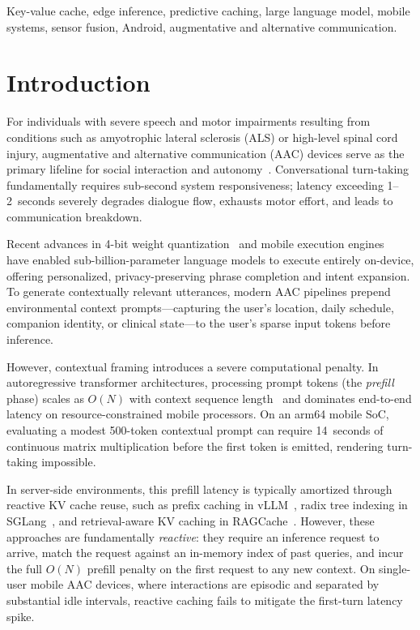 \documentclass[journal]{IEEEtran}
\begin{document}
\begin{IEEEkeywords}
Key-value cache, edge inference, predictive caching, large language model, mobile systems, sensor fusion, Android, augmentative and alternative communication.
\end{IEEEkeywords}

\section{Introduction}
\label{sec:introduction}

For individuals with severe speech and motor impairments resulting from conditions such as amyotrophic lateral sclerosis (ALS) or high-level spinal cord injury, augmentative and alternative communication (AAC) devices serve as the primary lifeline for social interaction and autonomy~\cite{beukelman2020}. Conversational turn-taking fundamentally requires sub-second system responsiveness; latency exceeding 1--2~seconds severely degrades dialogue flow, exhausts motor effort, and leads to communication breakdown.

Recent advances in 4-bit weight quantization~\cite{dettmers2022,frantar2022} and mobile execution engines~\cite{llamacpp} have enabled sub-billion-parameter language models to execute entirely on-device, offering personalized, privacy-preserving phrase completion and intent expansion. To generate contextually relevant utterances, modern AAC pipelines prepend environmental context prompts---capturing the user's location, daily schedule, companion identity, or clinical state---to the user's sparse input tokens before inference. 

However, contextual framing introduces a severe computational penalty. In autoregressive transformer architectures, processing prompt tokens (the \emph{prefill} phase) scales as $O(N)$ with context sequence length~\cite{vaswani2017} and dominates end-to-end latency on resource-constrained mobile processors. On an arm64 mobile SoC, evaluating a modest 500-token contextual prompt can require 14~seconds of continuous matrix multiplication before the first token is emitted, rendering turn-taking impossible.

In server-side environments, this prefill latency is typically amortized through reactive KV cache reuse, such as prefix caching in vLLM~\cite{vllm}, radix tree indexing in SGLang~\cite{sglang}, and retrieval-aware KV caching in RAGCache~\cite{ragcache}. However, these approaches are fundamentally \emph{reactive}: they require an inference request to arrive, match the request against an in-memory index of past queries, and incur the full $O(N)$ prefill penalty on the first request to any new context. On single-user mobile AAC devices, where interactions are episodic and separated by substantial idle intervals, reactive caching fails to mitigate the first-turn latency spike.
\end{document}
